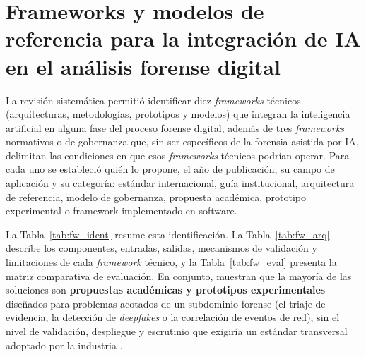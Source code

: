 \documentclass[journal]{IEEEtran}
\begin{document}
\section{Frameworks y modelos de referencia para la integración de IA en el análisis forense digital}
La revisión sistemática permitió identificar diez \textit{frameworks} técnicos (arquitecturas, metodologías, prototipos y modelos) que integran la inteligencia artificial en alguna fase del proceso forense digital, además de tres \textit{frameworks} normativos o de gobernanza que, sin ser específicos de la forensia asistida por IA, delimitan las condiciones en que esos \textit{frameworks} técnicos podrían operar. Para cada uno se estableció quién lo propone, el año de publicación, su campo de aplicación y su categoría: estándar internacional, guía institucional, arquitectura de referencia, modelo de gobernanza, propuesta académica, prototipo experimental o framework implementado en software.

La Tabla~\ref{tab:fw_ident} resume esta identificación. La Tabla~\ref{tab:fw_arq} describe los componentes, entradas, salidas, mecanismos de validación y limitaciones de cada \textit{framework} técnico, y la Tabla~\ref{tab:fw_eval} presenta la matriz comparativa de evaluación. En conjunto, muestran que la mayoría de las soluciones son \textbf{propuestas académicas y prototipos experimentales} diseñados para problemas acotados de un subdominio forense (el triaje de evidencia, la detección de \textit{deepfakes} o la correlación de eventos de red), sin el nivel de validación, despliegue y escrutinio que exigiría un estándar transversal adoptado por la industria \cite{FAHNDRICH2023301617}.
\end{document}
